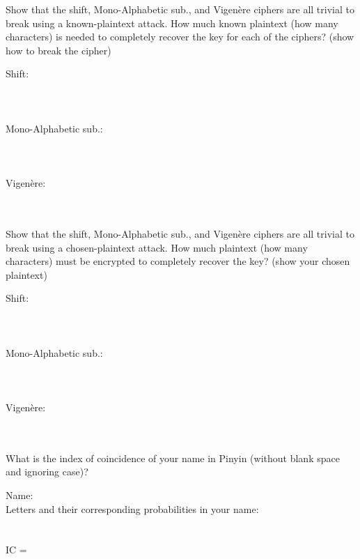 \documentclass[12pt,letterpaper,boxed]{amspset}
\begin{document}


\begin{problem}[1.4]
Show that the shift, Mono-Alphabetic sub., and Vigen\`{e}re ciphers are all trivial to break using a known-plaintext attack. How much known plaintext (how many characters) is needed to completely recover the key for each of the ciphers?  (show how to break the cipher)
\end{problem}

\begin{solution}
Shift:\\
\\
\\
\\
Mono-Alphabetic sub.:\\
\\
\\
\\
Vigen\`{e}re: \\
\\
\\
\end{solution}

\begin{problem}[1.5]
Show that the shift, Mono-Alphabetic sub., and Vigen\`{e}re ciphers are all trivial to break using a chosen-plaintext attack. How much plaintext (how many characters) must be encrypted to completely recover the key? (show your chosen plaintext) 
\end{problem}

\begin{solution}
Shift:\\
\\
\\
\\
Mono-Alphabetic sub.:\\
\\
\\
\\
Vigen\`{e}re: \\
\\
\\
\end{solution}

\begin{problem}[1.6]
What is the index of coincidence of your name in Pinyin (without blank space and ignoring case)?
\end{problem}

\begin{solution}
Name:\\
Letters and their corresponding probabilities in your name:\\
\\
\\
IC = 
\end{solution}
\end{document}
